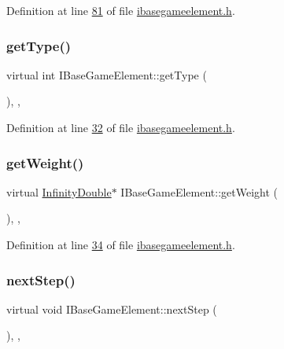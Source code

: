 Definition at line \hyperlink{a00047_source_l00081}{81} of file \hyperlink{a00047_source}{ibasegameelement.\+h}.

\mbox{\label{a00137_a639bd1e233821ff606bb8fe2931f6ee7}} 
\subsubsection{\texorpdfstring{get\+Type()}{getType()}}
{\footnotesize\ttfamily virtual int I\+Base\+Game\+Element\+::get\+Type (\begin{DoxyParamCaption}{ }\end{DoxyParamCaption})\hspace{0.3cm}{\ttfamily [inline]}, {\ttfamily [virtual]}, {\ttfamily [inherited]}}



Definition at line \hyperlink{a00047_source_l00032}{32} of file \hyperlink{a00047_source}{ibasegameelement.\+h}.

\mbox{\label{a00137_a935a07134430bbb44c3214629d607a3d}} 
\subsubsection{\texorpdfstring{get\+Weight()}{getWeight()}}
{\footnotesize\ttfamily virtual \hyperlink{a00161}{Infinity\+Double}$\ast$ I\+Base\+Game\+Element\+::get\+Weight (\begin{DoxyParamCaption}{ }\end{DoxyParamCaption})\hspace{0.3cm}{\ttfamily [inline]}, {\ttfamily [virtual]}, {\ttfamily [inherited]}}



Definition at line \hyperlink{a00047_source_l00034}{34} of file \hyperlink{a00047_source}{ibasegameelement.\+h}.

\mbox{\label{a00137_ae2be75da1a2a9edfabe993770e24654a}} 
\subsubsection{\texorpdfstring{next\+Step()}{nextStep()}}
{\footnotesize\ttfamily virtual void I\+Base\+Game\+Element\+::next\+Step (\begin{DoxyParamCaption}{ }\end{DoxyParamCaption})\hspace{0.3cm}{\ttfamily [inline]}, {\ttfamily [virtual]}, {\ttfamily [inherited]}}



